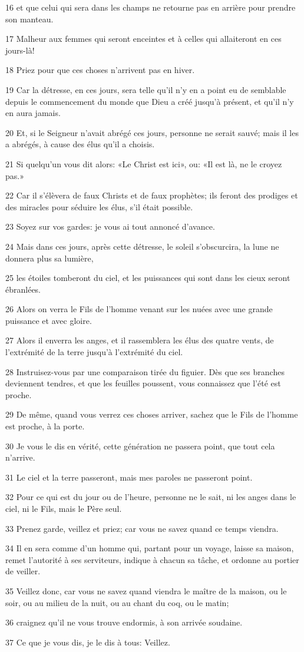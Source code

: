 \par 16 et que celui qui sera dans les champs ne retourne pas en arrière pour prendre son manteau.
\par 17 Malheur aux femmes qui seront enceintes et à celles qui allaiteront en ces jours-là!
\par 18 Priez pour que ces choses n'arrivent pas en hiver.
\par 19 Car la détresse, en ces jours, sera telle qu'il n'y en a point eu de semblable depuis le commencement du monde que Dieu a créé jusqu'à présent, et qu'il n'y en aura jamais.
\par 20 Et, si le Seigneur n'avait abrégé ces jours, personne ne serait sauvé; mais il les a abrégés, à cause des élus qu'il a choisis.
\par 21 Si quelqu'un vous dit alors: «Le Christ est ici», ou: «Il est là, ne le croyez pas.»
\par 22 Car il s'élèvera de faux Christs et de faux prophètes; ils feront des prodiges et des miracles pour séduire les élus, s'il était possible.
\par 23 Soyez sur vos gardes: je vous ai tout annoncé d'avance.
\par 24 Mais dans ces jours, après cette détresse, le soleil s'obscurcira, la lune ne donnera plus sa lumière,
\par 25 les étoiles tomberont du ciel, et les puissances qui sont dans les cieux seront ébranlées.
\par 26 Alors on verra le Fils de l'homme venant sur les nuées avec une grande puissance et avec gloire.
\par 27 Alors il enverra les anges, et il rassemblera les élus des quatre vents, de l'extrémité de la terre jusqu'à l'extrémité du ciel.
\par 28 Instruisez-vous par une comparaison tirée du figuier. Dès que ses branches deviennent tendres, et que les feuilles poussent, vous connaissez que l'été est proche.
\par 29 De même, quand vous verrez ces choses arriver, sachez que le Fils de l'homme est proche, à la porte.
\par 30 Je vous le dis en vérité, cette génération ne passera point, que tout cela n'arrive.
\par 31 Le ciel et la terre passeront, mais mes paroles ne passeront point.
\par 32 Pour ce qui est du jour ou de l'heure, personne ne le sait, ni les anges dans le ciel, ni le Fils, mais le Père seul.
\par 33 Prenez garde, veillez et priez; car vous ne savez quand ce temps viendra.
\par 34 Il en sera comme d'un homme qui, partant pour un voyage, laisse sa maison, remet l'autorité à ses serviteurs, indique à chacun sa tâche, et ordonne au portier de veiller.
\par 35 Veillez donc, car vous ne savez quand viendra le maître de la maison, ou le soir, ou au milieu de la nuit, ou au chant du coq, ou le matin;
\par 36 craignez qu'il ne vous trouve endormis, à son arrivée soudaine.
\par 37 Ce que je vous dis, je le dis à tous: Veillez.

